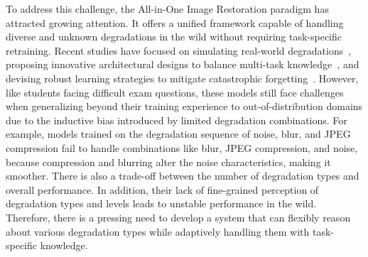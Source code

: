 To address this challenge, the All-in-One Image Restoration paradigm has attracted growing attention. It offers a unified framework capable of handling diverse and unknown degradations in the wild without requiring task-specific retraining. Recent studies have focused on simulating real-world degradations~\cite{peng2024towards}, proposing innovative architectural designs to balance multi-task knowledge~\cite{li2020knowledge}, and devising robust learning strategies to mitigate catastrophic forgetting~\cite{kirkpatrick2017overcoming}. However, like students facing difficult exam questions, these models still face challenges when generalizing beyond their training experience to out-of-distribution domains due to the inductive bias introduced by limited degradation combinations. For example, models trained on the degradation sequence of noise, blur, and JPEG compression fail to handle combinations like blur, JPEG compression, and noise, because compression and blurring alter the noise characteristics, making it smoother. There is also a trade-off between the number of degradation types and overall performance. In addition, their lack of fine-grained perception of degradation types and levels leads to unstable performance in the wild. Therefore, there is a pressing need to develop a system that can flexibly reason about various degradation types while adaptively handling them with task-specific knowledge.

